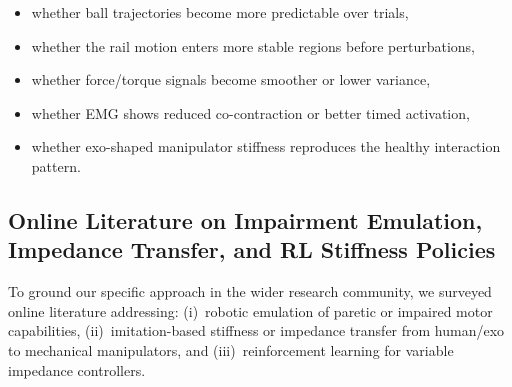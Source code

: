 \documentclass[11pt, a4paper]{article}
\begin{document}
\begin{itemize}[nosep]
  \item whether ball trajectories become more predictable over trials,
  \item whether the rail motion enters more stable regions before perturbations,
  \item whether force/torque signals become smoother or lower variance,
  \item whether EMG shows reduced co-contraction or better timed activation,
  \item whether exo-shaped manipulator stiffness reproduces the healthy interaction pattern.
\end{itemize}

\subsection{Online Literature on Impairment Emulation, Impedance Transfer, and RL Stiffness Policies}

To ground our specific approach in the wider research community, we surveyed online literature addressing: (i)~robotic emulation of paretic or impaired motor capabilities, (ii)~imitation-based stiffness or impedance transfer from human/exo to mechanical manipulators, and (iii)~reinforcement learning for variable impedance controllers.
\end{document}
